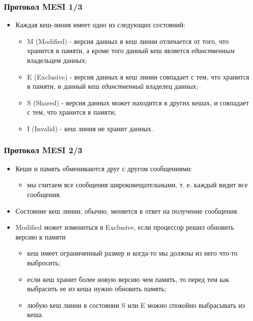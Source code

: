 \begin{frame}
\frametitle{Протокол MESI 1/3}
\begin{itemize}
  \item Каждая кеш-линия имеет одно из следующих состояний:
  \begin{itemize}
    \item M (Modified) - версия данных в кеш линии отличается от того, что
    хранится в памяти, а кроме того данный кеш является \emph{единственным}
    владельцем данных;
    \item E (Exclusive) - версия данных в кеш линии совпадает с тем, что
    хранится в памяти, и данный кеш \emph{единственный} владелец данных;
    \item S (Shared) - версия данных может находится в других кешах, и совпадает
    с тем, что хранится в памяти;
    \item I (Invalid) - кеш линия не хранит данных.
  \end{itemize}
\end{itemize}
\end{frame}

\begin{frame}
\frametitle{Протокол MESI 2/3}
\begin{itemize}
  \item Кеши и память обмениваются друг с другом сообщениями:
  \begin{itemize}
    \item мы считаем все сообщения широковещательными, т. е. каждый видит все
    сообщения.
  \end{itemize}
  \item Состояние кеш линии, обычно, меняется в ответ на получение сообщения.
  \item Modified может измениться в Exclusive, если процессор решил обновить
  версию в памяти
  \begin{itemize}
    \item кеш имеет ограниченный размер и когда-то мы должны из него что-то
    выбросить;
    \item если кеш хранит более новую версию чем память, то перед тем как
    выбрасить ее из кеша нужно обновить память;
    \item любую кеш линии в состоянии S или E можно спокойно выбрасывать из
    кеша.
  \end{itemize}
\end{itemize}
\end{frame}

